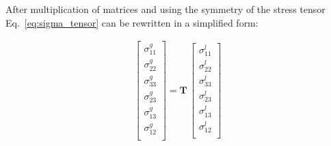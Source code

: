 \documentclass[materials,article,submit,moreauthors,pdftex]{Definitions/mdpi}
\begin{document}
After multiplication of matrices and using the symmetry of the stress tensor Eq.~\ref{eq:sigma_tensor} can be rewritten in a simplified form:

\begin{eqnarray}
\left [
\begin{array}{c}
\sigma^g_{11}\\
\sigma^g_{22}\\ 
\sigma^g_{33}\\ 
\sigma^g_{23}\\
\sigma^g_{13}\\
\sigma^g_{12}\\
\end{array}
\right ]=
\textbf{T}\,\left [
\begin{array}{c}
\sigma^l_{11}\\
\sigma^l_{22}\\ 
\sigma^l_{33}\\
\sigma^l_{23}\\
\sigma^l_{13}\\
\sigma^l_{12}\\
\end{array}
\right ]
\label{eq:stress}
\end{eqnarray}
\end{document}
